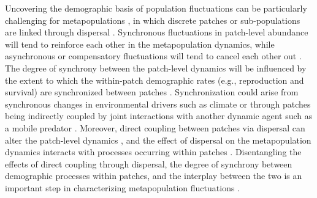 \documentclass[11pt]{article}
\begin{document}
Uncovering the demographic basis of population fluctuations can be particularly challenging
for metapopulations
\citep{bjornstad1999spatial}, 
in which discrete patches or sub-populations are linked through dispersal
\citep{hanski1998}.
Synchronous fluctuations in patch-level abundance will tend to reinforce each other 
in the metapopulation dynamics,
while asynchronous or compensatory fluctuations will tend to cancel each other out
\citep{liebhold2004spatial}. 
The degree of synchrony between the patch-level dynamics will be influenced
by the extent to which the within-patch demographic rates 
(e.g., reproduction and survival) are synchronized between patches
\citep{ranta1995synchrony, liebhold2004spatial}.
Synchronization could arise from synchronous changes in environmental
drivers such as climate 
\citep{moran1953}
or through patches being indirectly coupled by joint interactions with another 
dynamic agent such as a mobile predator
\citep{ims2000, gilg2009}. 
Moreover, direct coupling between patches via dispersal can alter the patch-level dynamics
\citep{liebhold2004spatial},
and the effect of dispersal on the metapopulation dynamics interacts 
with processes occurring within patches 
\citep{ranta1995synchrony, kendall2000dispersal, goldwyn2008}.
Disentangling the effects of direct coupling through dispersal, 
the degree of synchrony between demographic processes within patches, 
and the interplay between the two 
is an important step in characterizing metapopulation fluctuations
\citep{liebhold2004spatial, abbott2011}.
\end{document}
